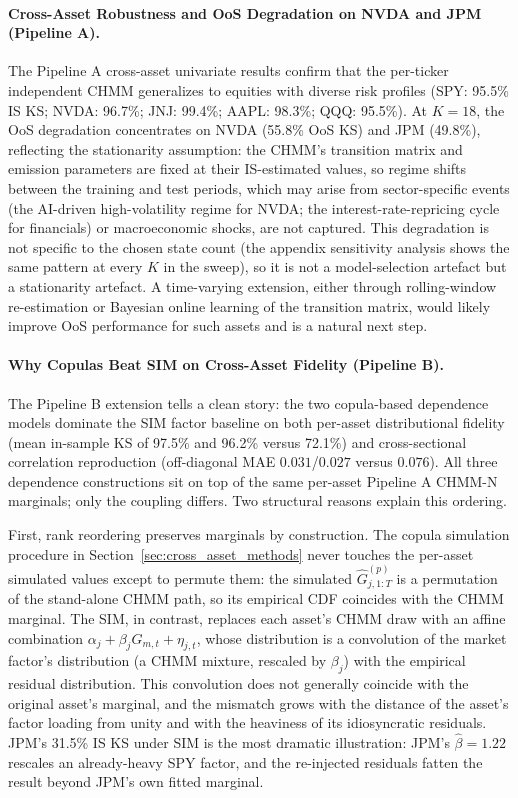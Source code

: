 \paragraph{Cross-Asset Robustness and OoS Degradation on NVDA and JPM (Pipeline A).}
The Pipeline A cross-asset univariate results confirm that the per-ticker independent CHMM generalizes to equities with diverse risk profiles (SPY: 95.5\% IS KS; NVDA: 96.7\%; JNJ: 99.4\%; AAPL: 98.3\%; QQQ: 95.5\%).
At $K = 18$, the OoS degradation concentrates on NVDA (55.8\% OoS KS) and JPM (49.8\%), reflecting the stationarity assumption: the CHMM's transition matrix and emission parameters are fixed at their IS-estimated values, so regime shifts between the training and test periods, which may arise from sector-specific events (the AI-driven high-volatility regime for NVDA; the interest-rate-repricing cycle for financials) or macroeconomic shocks, are not captured.
This degradation is not specific to the chosen state count (the appendix sensitivity analysis shows the same pattern at every $K$ in the sweep), so it is not a model-selection artefact but a stationarity artefact.
A time-varying extension, either through rolling-window re-estimation or Bayesian online learning of the transition matrix, would likely improve OoS performance for such assets and is a natural next step.

\paragraph{Why Copulas Beat SIM on Cross-Asset Fidelity (Pipeline B).}
The Pipeline B extension tells a clean story: the two copula-based dependence models dominate the SIM factor baseline on both per-asset distributional fidelity (mean in-sample KS of 97.5\% and 96.2\% versus 72.1\%) and cross-sectional correlation reproduction (off-diagonal MAE $0.031$/$0.027$ versus $0.076$). All three dependence constructions sit on top of the same per-asset Pipeline A CHMM-N marginals; only the coupling differs.
Two structural reasons explain this ordering.

First, rank reordering preserves marginals by construction.
The copula simulation procedure in Section~\ref{sec:cross_asset_methods} never touches the per-asset simulated values except to permute them: the simulated $\hat{G}_{j,1:T}^{(p)}$ is a permutation of the stand-alone CHMM path, so its empirical CDF coincides with the CHMM marginal.
The SIM, in contrast, replaces each asset's CHMM draw with an affine combination $\alpha_j + \beta_j G_{m,t} + \eta_{j,t}$, whose distribution is a convolution of the market factor's distribution (a CHMM mixture, rescaled by $\beta_j$) with the empirical residual distribution.
This convolution does not generally coincide with the original asset's marginal, and the mismatch grows with the distance of the asset's factor loading from unity and with the heaviness of its idiosyncratic residuals.
JPM's 31.5\% IS KS under SIM is the most dramatic illustration: JPM's $\hat{\beta} = 1.22$ rescales an already-heavy SPY factor, and the re-injected residuals fatten the result beyond JPM's own fitted marginal.

